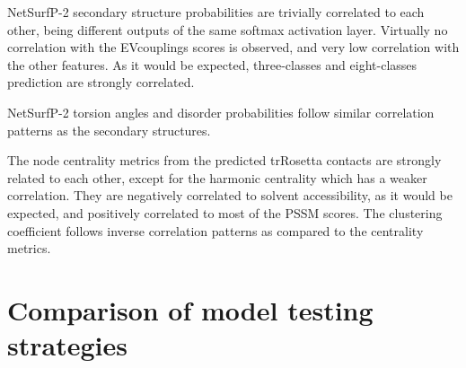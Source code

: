 NetSurfP-2 secondary structure probabilities are trivially correlated to each other, being different outputs of the same softmax activation layer.
Virtually no correlation with the EVcouplings scores is observed, and very low correlation with the other features.
As it would be expected, three-classes and eight-classes prediction are strongly correlated.

NetSurfP-2 torsion angles and disorder probabilities follow similar correlation patterns as the secondary structures.

The node centrality metrics from the predicted trRosetta contacts are strongly related to each other, except for the harmonic centrality which has a weaker correlation.
They are negatively correlated to solvent accessibility, as it would be expected, and positively correlated to most of the PSSM scores.
The clustering coefficient follows inverse correlation patterns as compared to the centrality metrics.

\FloatBarrier%
\section{Comparison of model testing strategies}

\begin{figure}[p]
\end{figure}


